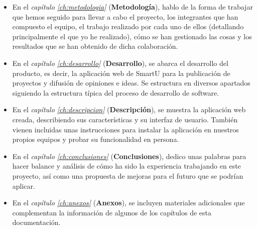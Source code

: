 \begin{itemize}
    \item En el \textit{capítulo \ref{ch:metodologia}} (\textbf{Metodología}), hablo de la forma de trabajar que hemos seguido para llevar a cabo el proyecto, los integrantes que han compuesto el equipo, el trabajo realizado por cada uno de ellos (detallando principalmente el que yo he realizado), cómo se han gestionado las cosas y los resultados que se han obtenido de dicha colaboración.
    \item En el \textit{capítulo \ref{ch:desarrollo}} (\textbf{Desarrollo}), se abarca el desarrollo del producto, es decir, la aplicación web de SmartU para la publicación de proyectos y difusión de opiniones e ideas. Se estructura en diversos apartados siguiendo la estructura típica del proceso de desarrollo de software.
    \item En el \textit{capítulo \ref{ch:descripcion}} (\textbf{Descripción}), se muestra la aplicación web creada, describiendo sus características y su interfaz de usuario. También vienen incluidas unas instrucciones para instalar la aplicación en nuestros propios equipos y probar su funcionalidad en persona.
    \item En el \textit{capítulo \ref{ch:conclusiones}} (\textbf{Conclusiones}), dedico unas palabras para hacer balance y análisis de cómo ha sido la experiencia trabajando en este proyecto, así como una propuesta de mejoras para el futuro que se podrían aplicar.
    \item En el \textit{capítulo \ref{ch:anexos}} (\textbf{Anexos}), se incluyen materiales adicionales que complementan la información de algunos de los capítulos de esta documentación.
\end{itemize}
